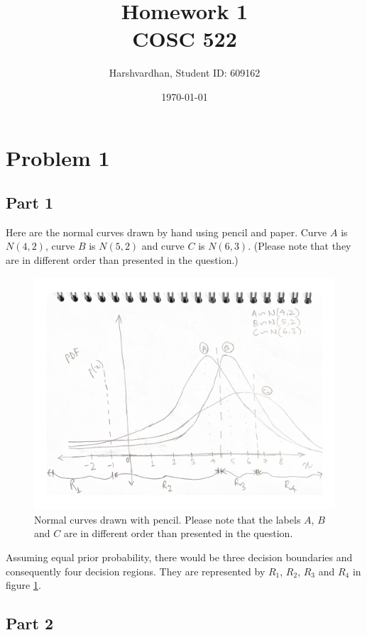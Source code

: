 \documentclass{article}
\title{Homework 1 \\ 
	\large COSC 522}
\author{Harshvardhan, Student ID: 609162}
\date{\today}
\begin{document}
	\maketitle


\section*{Problem 1}

\subsection*{Part 1}

Here are the normal curves drawn by hand using pencil and paper. Curve $A$ is $N(4,2)$, curve $B$ is $N(5,2)$ and curve $C$ is $N(6,3)$. (Please note that they are in different order than presented in the question.)

\begin{figure}[H]
	\centering
    \includegraphics[width=\textwidth]{scan.pdf}
    \caption{Normal curves drawn with pencil. Please note that the labels $A$, $B$ and $C$ are in different order than presented in the question.}
    \label{fig:scan}
\end{figure}

Assuming equal prior probability, there would be three decision boundaries and consequently four decision regions. They are represented by $R_1$, $R_2$, $R_3$ and $R_4$ in figure \ref{fig:scan}.

\subsection*{Part 2}
\end{document}
